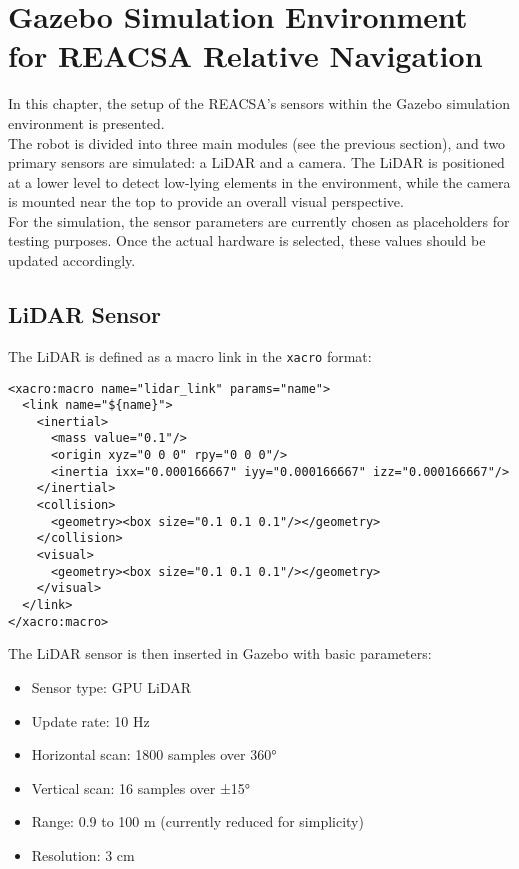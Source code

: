 \chapter{Gazebo Simulation Environment for REACSA Relative Navigation}

In this chapter, the setup of the REACSA's sensors within the Gazebo simulation environment is presented. 
\\
The robot is divided into three main modules (see the previous section), and two primary sensors are simulated: a LiDAR and a camera. 
The LiDAR is positioned at a lower level to detect low-lying elements in the environment, while the camera is mounted near the top to provide an overall visual perspective.
\\
For the simulation, the sensor parameters are currently chosen as placeholders for testing purposes. Once the actual hardware is selected, these values should be updated accordingly.

\section{LiDAR Sensor}

The LiDAR is defined as a macro link in the \texttt{xacro} format:

\begin{lstlisting}[basicstyle=\ttfamily\scriptsize]
<xacro:macro name="lidar_link" params="name">
  <link name="${name}">
    <inertial>
      <mass value="0.1"/>
      <origin xyz="0 0 0" rpy="0 0 0"/>
      <inertia ixx="0.000166667" iyy="0.000166667" izz="0.000166667"/>
    </inertial>
    <collision>
      <geometry><box size="0.1 0.1 0.1"/></geometry>
    </collision>
    <visual>
      <geometry><box size="0.1 0.1 0.1"/></geometry>
    </visual>
  </link>
</xacro:macro>
\end{lstlisting}

\noindent The LiDAR sensor is then inserted in Gazebo with basic parameters:

\begin{itemize}
    \item Sensor type: GPU LiDAR
    \item Update rate: 10 Hz
    \item Horizontal scan: 1800 samples over 360°
    \item Vertical scan: 16 samples over ±15°
    \item Range: 0.9 to 100 m (currently reduced for simplicity)
    \item Resolution: 3 cm
\end{itemize}

